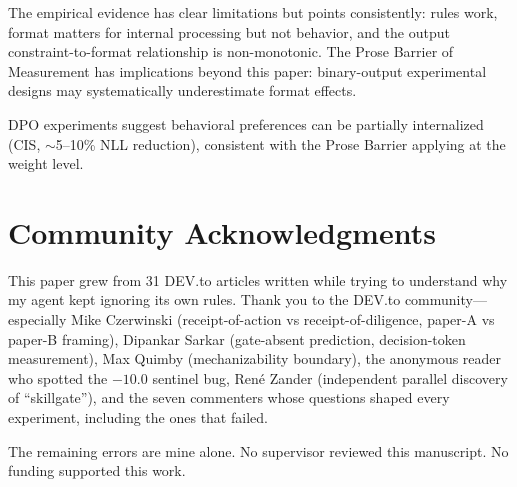 \documentclass[11pt]{article}
\begin{document}
The empirical evidence has clear limitations but points consistently: rules
work, format matters for internal processing but not behavior, and the output
constraint-to-format relationship is non-monotonic. The Prose Barrier of
Measurement has implications beyond this paper: binary-output experimental
designs may systematically underestimate format effects.

DPO experiments suggest behavioral preferences can be partially internalized
(CIS, $\sim$5--10\% NLL reduction), consistent with the Prose Barrier applying
at the weight level.

\section*{Community Acknowledgments}

This paper grew from 31 DEV.to articles written while trying to understand why
my agent kept ignoring its own rules. Thank you to the DEV.to community---
especially Mike Czerwinski (receipt-of-action vs receipt-of-diligence, paper-A
vs paper-B framing), Dipankar Sarkar (gate-absent prediction, decision-token
measurement), Max Quimby (mechanizability boundary), the anonymous reader who
spotted the $-10.0$ sentinel bug, René Zander (independent parallel discovery of
``skillgate''), and the seven commenters whose questions shaped every experiment,
including the ones that failed.

The remaining errors are mine alone. No supervisor reviewed this manuscript.
No funding supported this work.



\end{document}
